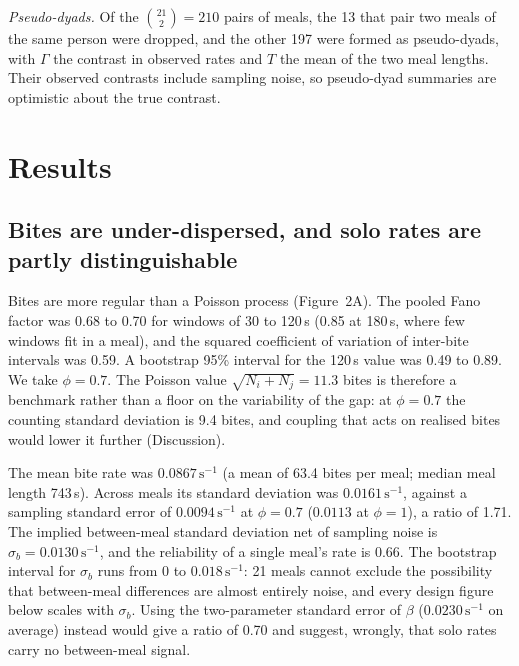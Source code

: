 \documentclass[12pt]{article}
\begin{document}
\emph{Pseudo-dyads.} Of the $\binom{21}{2}=210$ pairs of meals, the 13 that pair
two meals of the same person were dropped, and the other 197 were formed as
pseudo-dyads, with $\Gamma$ the contrast in observed rates and $T$ the mean of the
two meal lengths. Their observed contrasts include sampling noise, so
pseudo-dyad summaries are optimistic about the true contrast.

\section*{Results}

\subsection*{Bites are under-dispersed, and solo rates are partly distinguishable}

Bites are more regular than a Poisson process (Figure~2A). The pooled Fano factor
was 0.68 to 0.70 for windows of 30 to 120\,s (0.85 at 180\,s, where few windows
fit in a meal), and the squared coefficient of variation of inter-bite intervals
was 0.59. A bootstrap 95\% interval for the 120\,s value was 0.49 to 0.89. We take
$\phi=0.7$. The Poisson value $\sqrt{N_i+N_j}=11.3$ bites is therefore a
benchmark rather than a floor on the variability of the gap: at $\phi=0.7$ the
counting standard deviation is 9.4 bites, and coupling that acts on realised
bites would lower it further (Discussion).

The mean bite rate was $0.0867\,\mathrm{s}^{-1}$ (a mean of 63.4 bites per meal; median meal length 743\,s). Across meals its standard deviation was $0.0161\,\mathrm{s}^{-1}$,
against a sampling standard error of $0.0094\,\mathrm{s}^{-1}$ at $\phi=0.7$
($0.0113$ at $\phi=1$), a ratio of 1.71. The implied between-meal standard
deviation net of sampling noise is $\sigma_b=0.0130\,\mathrm{s}^{-1}$, and the
reliability of a single meal's rate is 0.66. The bootstrap interval for $\sigma_b$
runs from 0 to $0.018\,\mathrm{s}^{-1}$: 21 meals cannot exclude the possibility
that between-meal differences are almost entirely noise, and every design figure
below scales with $\sigma_b$. Using the two-parameter standard error of $\beta$
($0.0230\,\mathrm{s}^{-1}$ on average) instead would give a ratio of 0.70 and suggest,
wrongly, that solo rates carry no between-meal signal.
\end{document}
